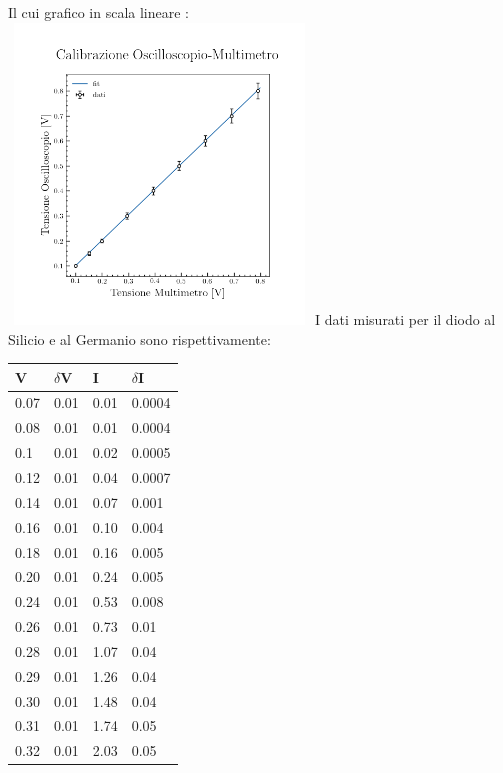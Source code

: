 \documentclass{article}
\begin{document}
    Il cui grafico in scala lineare :\\
    \includegraphics[width = 8cm, height = 8cm]{calibrazione/calibrazione.png}
    \newpage
    I dati misurati per il diodo al Silicio e al Germanio sono rispettivamente:\\
    \begin{tabular}{|p{1cm}|p{1cm}|p{1cm}|p{1cm}|}
        \hline
        \textbf V & $\delta$V & I & $\delta$I \\
        \hline
        0.07 & 0.01 & 0.01 & 0.0004\\
        0.08 & 0.01 & 0.01 & 0.0004\\
        0.1  & 0.01 & 0.02 & 0.0005\\
        0.12 & 0.01 & 0.04 & 0.0007\\
        0.14 & 0.01 & 0.07 & 0.001\\
        0.16 & 0.01 & 0.10 & 0.004\\
        0.18 & 0.01 & 0.16 & 0.005\\
        0.20 & 0.01 & 0.24 & 0.005\\
        0.24 & 0.01 & 0.53 & 0.008\\
        0.26 & 0.01 & 0.73 & 0.01\\
        0.28 & 0.01 & 1.07 & 0.04\\
        0.29 & 0.01 & 1.26 & 0.04\\
        0.30 & 0.01 & 1.48 & 0.04\\
        0.31 & 0.01 & 1.74 & 0.05\\
        0.32 & 0.01 & 2.03 & 0.05\\
        \hline      
    \end{tabular}
    \hspace{2cm}
\end{document}
